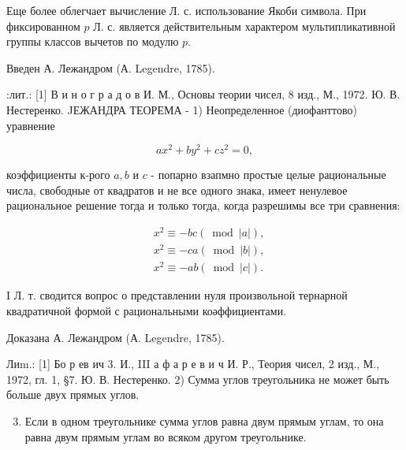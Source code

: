 \documentclass[10pt]{article}
\begin{document}
Еще более облегчает вычисление Л. с. использование Якоби символа. При фиксированном $p$ Л. с. является действительным характером мультипликативной группы классов вычетов по модулю $p$.



Введен А. Лежандром (А. Legendre, 1785).



:лит.: [1] В и н о г р а д о в И. М., Основы теории чисел, 8 изд., М., 1972. Ю. В. Нестеренко. JЕЖАНДРА ТЕОРЕМА - 1) Неопределенное (диофанттово) уравнение



\[

a x^{2}+b y^{2}+c z^{2}=0,

\]



коэффициенты к-рого $a, b$ и $c$ - попарно взапмно простые целые рациональные числа, свободные от квадратов и не все одного знака, имеет ненулевое рациональное решение тогда и только тогда, когда разрешимы все три сравнения:



\[

\begin{aligned}

& x^{2} \equiv-b c(\bmod |a|), \\

& x^{2} \equiv-c a(\bmod |b|), \\

& x^{2} \equiv-a b(\bmod |c|) .

\end{aligned}

\]



I Л. т. сводится вопрос $о$ представлении нуля произвольной тернарной квадратичной формой с рациональными коәффициентами.



Доказана А. Лежандром (А. Legendre, 1785).



Лиm.: [1] Бо р ев ич 3. И., III а ф а р е в и ч И. Р., Теория чисел, 2 изд., М., 1972, гл. 1, §7. Ю. В. Нестеренко. 2) Сумма углов треугольника не может быть больше двух прямых углов.



\begin{enumerate}

  \setcounter{enumi}{2}

  \item Если в одном треугольнике сумма углов равна двум прямым углам, то она равна двум прямым углам во всяком другом треугольнике.

\end{enumerate}
\end{document}
